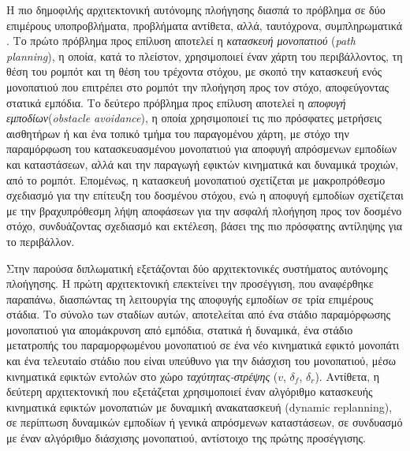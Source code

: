 \bigskip
Η πιο δημοφιλής αρχιτεκτονική αυτόνομης πλοήγησης διασπά το πρόβλημα σε δύο επιμέρους υποπροβλήματα, προβλήματα αντίθετα, αλλά, ταυτόχρονα, συμπληρωματικά \cite{autonomous_mobile_robots}. Το πρώτο πρόβλημα προς επίλυση αποτελεί η \textit{κατασκευή μονοπατιού} (\textit{path planning}), η οποία, κατά το πλείστον, χρησιμοποιεί έναν χάρτη του περιβάλλοντος, τη θέση του ρομπότ και τη θέση του τρέχοντα στόχου, με σκοπό την κατασκευή ενός μονοπατιού που επιτρέπει στο ρομπότ την πλοήγηση προς τον στόχο, αποφεύγοντας στατικά εμπόδια. Το δεύτερο πρόβλημα προς επίλυση αποτελεί η \textit{αποφυγή εμποδίων}(\textit{obstacle avoidance}), η οποία χρησιμοποιεί τις πιο πρόσφατες μετρήσεις αισθητήρων ή και ένα τοπικό τμήμα του παραγομένου χάρτη, με στόχο την παραμόρφωση του κατασκευασμένου μονοπατιού για αποφυγή απρόσμενων εμποδίων και καταστάσεων, αλλά και την παραγωγή εφικτών κινηματικά και δυναμικά τροχιών, από το ρομπότ. Επομένως, η κατασκευή μονοπατιού σχετίζεται με μακροπρόθεσμο σχεδιασμό για την επίτευξη του δοσμένου στόχου, ενώ η αποφυγή εμποδίων σχετίζεται με την βραχυπρόθεσμη λήψη αποφάσεων για την ασφαλή πλοήγηση προς τον δοσμένο στόχο, συνδυάζοντας σχεδιασμό και εκτέλεση, βάσει της πιο πρόσφατης αντίληψης για το περιβάλλον.

\bigskip
Στην παρούσα διπλωματική εξετάζονται δύο αρχιτεκτονικές συστήματος αυτόνομης πλοήγησης. Η πρώτη αρχιτεκτονική επεκτείνει την προσέγγιση, που αναφέρθηκε παραπάνω, διασπώντας τη λειτουργία της αποφυγής εμποδίων σε τρία επιμέρους στάδια. Το σύνολο των σταδίων αυτών, αποτελείται από ένα στάδιο παραμόρφωσης μονοπατιού για απομάκρυνση από εμπόδια, στατικά ή δυναμικά, ένα στάδιο μετατροπής του παραμορφωμένου μονοπατιού σε ένα νέο κινηματικά εφικτό μονοπάτι και ένα τελευταίο στάδιο που είναι υπεύθυνο για την διάσχιση του μονοπατιού, μέσω κινηματικά εφικτών εντολών στο χώρο \textit{ταχύτητας-στρέψης} ($v$, $\delta_f$, $\delta_r$). Αντίθετα, η δεύτερη αρχιτεκτονική που εξετάζεται χρησιμοποιεί έναν αλγόριθμο κατασκευής κινηματικά εφικτών μονοπατιών με δυναμική ανακατασκευή (dynamic replanning), σε περίπτωση δυναμικών εμποδίων ή γενικά απρόσμενων καταστάσεων, σε συνδυασμό με έναν αλγόριθμο διάσχισης μονοπατιού, αντίστοιχο της πρώτης προσέγγισης.

